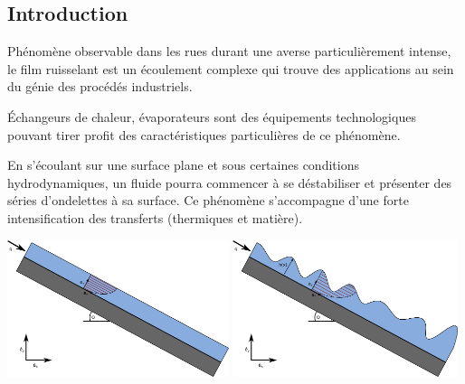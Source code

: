 \documentclass[a0,portrait]{a0poster}
\begin{document}
\begin{multicols}{2}
    \setlength{\columnseprule}{0pt}

    \section*{Introduction}

    Phénomène observable dans les rues durant une averse particulièrement intense, le film ruisselant est un écoulement complexe qui trouve des applications au sein du génie des procédés industriels.

    Échangeurs de chaleur, évaporateurs sont des équipements technologiques pouvant tirer profit des caractéristiques particulières de ce phénomène.

    En s'écoulant sur une surface plane et sous certaines conditions hydrodynamiques, un fluide pourra commencer à se déstabiliser et présenter des séries d'ondelettes à sa surface. Ce phénomène s'accompagne d'une forte intensification des transferts (thermiques et matière).

    \begin{multicols}{2}
        \begin{center}\vspace{.2cm}
        \end{center}\vspace{.2cm}
        \columnbreak
        \begin{center}\vspace{.5cm}
        	\includegraphics[height=4cm]{thinfilm}
            \includegraphics[height=4cm]{thinfilm_unstable}
        \end{center}\vspace{.5cm}
    \end{multicols}


\end{multicols}
\end{document}
